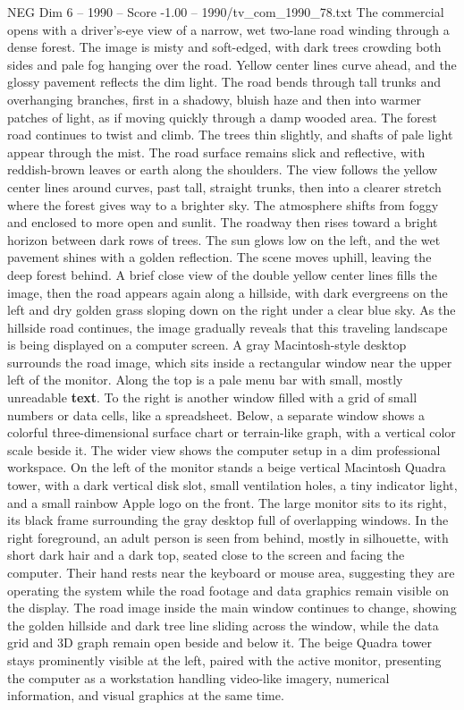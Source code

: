 \begin{textsample}{NEG Dim 6 – 1990 – Score -1.00 – 1990/tv\_com\_1990\_78.txt}  \label{ex:f6_neg_029}
The commercial opens with a driver’s-eye view of a narrow, wet two-lane road winding through a dense forest.
The image is misty and soft-edged, with dark trees crowding both sides and pale fog hanging over the road.
Yellow center lines curve ahead, and the glossy pavement reflects the dim light.
The road bends through tall trunks and overhanging branches, first in a shadowy, bluish haze and then into warmer patches of light, as if moving quickly through a damp wooded area.
The forest road continues to twist and climb.
The trees thin slightly, and shafts of pale light appear through the mist.
The road surface remains slick and reflective, with reddish-brown leaves or earth along the shoulders.
The view follows the yellow center lines around curves, past tall, straight trunks, then into a clearer stretch where the forest gives way to a brighter sky.
The atmosphere shifts from foggy and enclosed to more open and sunlit.
The roadway then rises toward a bright horizon between dark rows of trees.
The sun glows low on the left, and the wet pavement shines with a golden reflection.
The scene moves uphill, leaving the deep forest behind.
A brief close view of the double yellow center lines fills the image, then the road appears again along a hillside, with dark evergreens on the left and dry golden grass sloping down on the right under a clear blue sky.
As the hillside road continues, the image gradually reveals that this traveling landscape is being displayed on a computer screen.
A gray Macintosh-style desktop surrounds the road image, which sits inside a rectangular window near the upper left of the monitor.
Along the top is a pale menu bar with small, mostly unreadable \textbf{text}.
To the right is another window filled with a grid of small numbers or data cells, like a spreadsheet.
Below, a separate window shows a colorful three-dimensional surface chart or terrain-like graph, with a vertical color scale beside it.
The wider view shows the computer setup in a dim professional workspace.
On the left of the monitor stands a beige vertical Macintosh Quadra tower, with a dark vertical disk slot, small ventilation holes, a tiny indicator light, and a small rainbow Apple logo on the front.
The large monitor sits to its right, its black frame surrounding the gray desktop full of overlapping windows.
In the right foreground, an adult person is seen from behind, mostly in silhouette, with short dark hair and a dark top, seated close to the screen and facing the computer.
Their hand rests near the keyboard or mouse area, suggesting they are operating the system while the road footage and data graphics remain visible on the display.
The road image inside the main window continues to change, showing the golden hillside and dark tree line sliding across the window, while the data grid and 3D graph remain open beside and below it.
The beige Quadra tower stays prominently visible at the left, paired with the active monitor, presenting the computer as a workstation handling video-like imagery, numerical information, and visual graphics at the same time.

\end{textsample}
